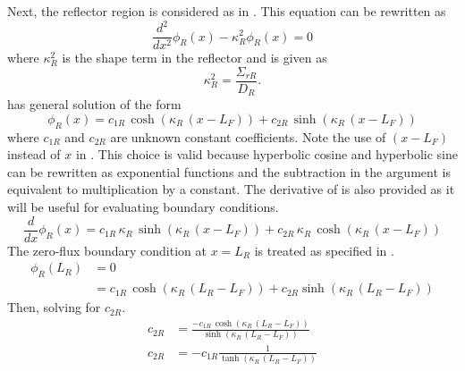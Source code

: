   Next, the reflector region is considered as in . This equation
  can be rewritten as
  \begin{equation}
    \label{eq:2regR_buckle}
    \frac{d^2}{dx^2} \phi_R(x) - \kappa_R^2 \phi_R(x) = 0
  \end{equation}
  where $\kappa_R^2$ is the shape term in the reflector and is given as
  \begin{equation}
    \label{eq:2regR_b2}
    \kappa_R^2 = \frac{\Sigma_{rR}}{D_R}.
  \end{equation}
   has general solution of the form
  \begin{equation}
    \label{eq:2regR_general}
    \phi_R(x) = c_{1R} \, \cosh(\kappa_R\, (x-L_F)) + c_{2R} \, 
      \sinh(\kappa_R\,(x-L_F))
  \end{equation}
  where $c_{1R}$ and $c_{2R}$ are unknown constant coefficients.
  Note the use of $(x-L_F)$ instead of $x$ in . This
  choice is valid because hyperbolic cosine and hyperbolic sine can be rewritten
  as exponential functions and the subtraction in the argument is equivalent to
  multiplication by a constant.
  The derivative of  is also provided as it will be
  useful for evaluating boundary conditions.
  \begin{equation}
    \label{eq:2regR_general_derivative}
    \frac{d}{dx} \phi_R(x) = c_{1R} \, \kappa_R \, \sinh(\kappa_R \, (x-L_F)) + 
      c_{2R} \, \kappa_R \, \cosh(\kappa_R \, (x-L_F))
  \end{equation}
  The zero-flux boundary condition at $x=L_R$ is treated as specified in
  .
  \begin{align}
    \phi_R(L_R) &= 0 \\
    &= c_{1R} \, \cosh(\kappa_R \, (L_R - L_F)) + c_{2R} \sinh(\kappa_R \, (L_R-L_F))
  \end{align}
  Then, solving for $c_{2R}$.
  \begin{align}
    c_{2R} &= \frac{-c_{1R}\,\cosh(\kappa_R\,(L_R - L_F))}{\sinh(\kappa_R \,(L_R-L_F))} \\
    \label{eq:2reg_c2r_a}
    c_{2R} &= -c_{1R} \frac{1}{\tanh(\kappa_R\,(L_R-L_F))}
  \end{align}

